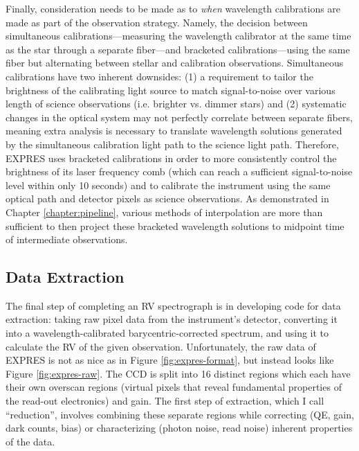 Finally, consideration needs to be made as to \textit{when} wavelength calibrations are made as part of the observation strategy. Namely, the decision between simultaneous calibrations---measuring the wavelength calibrator at the same time as the star through a separate fiber---and bracketed calibrations---using the same fiber but alternating between stellar and calibration observations. Simultaneous calibrations have two inherent downsides: (1) a requirement to tailor the brightness of the calibrating light source to match signal-to-noise over various length of science observations (i.e. brighter vs. dimmer stars) and (2) systematic changes in the optical system may not perfectly correlate between separate fibers, meaning extra analysis is necessary to translate wavelength solutions generated by the simultaneous calibration light path to the science light path. Therefore, EXPRES uses bracketed calibrations in order to more consistently control the brightness of its laser frequency comb (which can reach a sufficient signal-to-noise level within only 10 seconds) and to calibrate the instrument using the same optical path and detector pixels as science observations. As demonstrated in Chapter \ref{chapter:pipeline}, various methods of interpolation are more than sufficient to then project these bracketed wavelength solutions to midpoint time of intermediate observations.

\subsection{Data Extraction} \label{intro:extraction}

The final step of completing an RV spectrograph is in developing code for data extraction: taking raw pixel data from the instrument's detector, converting it into a wavelength-calibrated barycentric-corrected spectrum, and using it to calculate the RV of the given observation. Unfortunately, the raw data of EXPRES is not as nice as in Figure \ref{fig:expres-format}, but instead looks like Figure \ref{fig:expres-raw}. The CCD is split into 16 distinct regions which each have their own overscan regions (virtual pixels that reveal fundamental properties of the read-out electronics) and gain. The first step of extraction, which I call ``reduction'', involves combining these separate regions while correcting (QE, gain, dark counts, bias) or characterizing (photon noise, read noise) inherent properties of the data.

